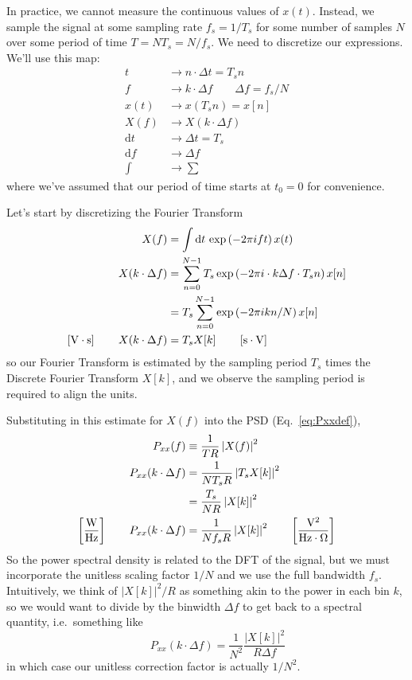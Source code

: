 \documentclass{article}
\newcommand{\dd}[1]{\mathrm{d}#1\,}
\begin{document}
In practice, we cannot measure the continuous values of \(x(t)\). Instead, we sample
the signal at some sampling rate \(f_s = 1/T_s\) for some number of samples \(N\) over some
period of time \(T = NT_s=N/f_s\). We need to discretize our expressions. We'll use
this map:
%
\begin{align*}
    t & \to n\cdot \Delta t = T_s n \\
    f & \to k \cdot \Delta f \qquad \Delta f = f_s/N \\
    x(t) & \to x(T_s n) = x[n] \\
    X(f) & \to X(k\cdot \Delta f) \\
    \dd{t} & \to \Delta t = T_s \\
    \dd{f} & \to \Delta f \\
    \int & \to \sum
\end{align*}
%
where we've assumed that our period of time starts at \(t_0 = 0\) for convenience. 

Let's start by discretizing the Fourier Transform
%
\begin{align}
    X(f) & = \int \dd{t} \exp\left(-2\pi i f t\right) x(t) \notag \\
    X(k\cdot \Delta f) & = \sum_{n=0}^{N-1} T_s \exp\left(-2\pi i \cdot k\Delta f \cdot T_s n\right) x[n] \notag \\
    & = T_s \sum_{n=0}^{N-1} \exp\left(-2\pi i kn/N\right) x[n] \notag \\
    \left[\mathrm{V\cdot s}\right]\qquad X(k\cdot \Delta f) & = T_s X[k] \qquad \left[\mathrm{s\cdot V}\right]\label{eq:XktoXf}
\end{align}
%
so our Fourier Transform is estimated by the sampling period \(T_s\) times the 
Discrete Fourier Transform \(X[k]\), and we observe the sampling period is required
to align the units. 

Substituting in this estimate for \(X(f)\) into the PSD (Eq.~\eqref{eq:Pxxdef}),
%
\begin{align}
    P_{xx}(f) & \equiv \frac{1}{TR} \left|X(f)\right|^2 \notag \\
    P_{xx}(k\cdot \Delta f) & = \frac{1}{N T_s R} \left|T_s X[k]\right|^2 \notag \\
    & = \frac{T_s}{N R} \left|X[k]\right|^2 \notag \\
    \left[\mathrm{\frac{W}{Hz}}\right] \qquad P_{xx}(k\cdot \Delta f) & = \frac{1}{N f_s R} \left|X[k]\right|^2 \qquad \left[\mathrm{\frac{V^2}{Hz\cdot \Omega}}\right] \label{eq:Pxxkdf}
\end{align}
%
So the power spectral density is related to the DFT of the signal, but we must
incorporate the unitless scaling factor \(1/N\) and we use the full bandwidth
\(f_s\). Intuitively, we think of \(\left|X[k]\right|^2/R\) as something akin to 
the power in each bin \(k\), so we would want to divide by the binwidth \(\Delta f\)
to get back to a spectral quantity, i.e.~something like
%
\begin{equation}
    \qquad P_{xx}(k\cdot \Delta f) = \frac{1}{N^2} \frac{\left|X[k]\right|^2}{R\Delta f}
\end{equation}
%
in which case our unitless correction factor is actually \(1/N^2\).
\end{document}

